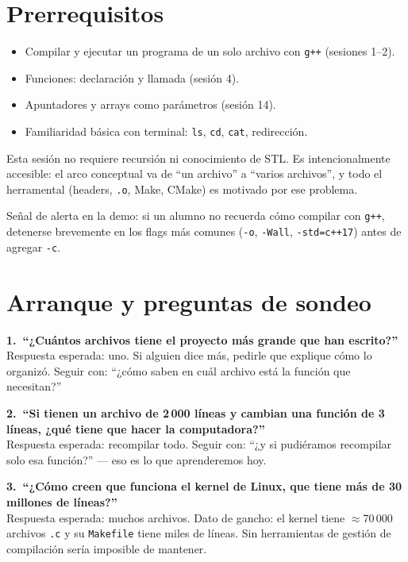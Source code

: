 \documentclass[12pt, oneside]{article}
\begin{document}
\section{Prerrequisitos}

\begin{itemize}
  \item Compilar y ejecutar un programa de un solo archivo con \texttt{g++}
        (sesiones 1--2).
  \item Funciones: declaración y llamada (sesión 4).
  \item Apuntadores y arrays como parámetros (sesión 14).
  \item Familiaridad básica con terminal: \texttt{ls}, \texttt{cd},
        \texttt{cat}, redirección.
\end{itemize}

\begin{notaprofesor}
  Esta sesión no requiere recursión ni conocimiento de STL.  Es intencionalmente
  accesible: el arco conceptual va de ``un archivo'' a ``varios archivos'', y todo
  el herramental (headers, \texttt{.o}, Make, CMake) es motivado por ese problema.
  \par\smallskip
  Señal de alerta en la demo: si un alumno no recuerda cómo compilar con
  \texttt{g++}, detenerse brevemente en los flags más comunes (\texttt{-o},
  \texttt{-Wall}, \texttt{-std=c++17}) antes de agregar \texttt{-c}.
\end{notaprofesor}

\section{Arranque y preguntas de sondeo}

\begin{notaprofesor}
  \textbf{1.\ ``¿Cuántos archivos tiene el proyecto más grande que han escrito?''}\\
  Respuesta esperada: uno.  Si alguien dice más, pedirle que explique cómo
  lo organizó.  Seguir con: ``¿cómo saben en cuál archivo está la función
  que necesitan?''

  \medskip
  \textbf{2.\ ``Si tienen un archivo de 2\,000 líneas y cambian una función
  de 3 líneas, ¿qué tiene que hacer la computadora?''}\\
  Respuesta esperada: recompilar todo.  Seguir con: ``¿y si pudiéramos
  recompilar solo esa función?'' — eso es lo que aprenderemos hoy.

  \medskip
  \textbf{3.\ ``¿Cómo creen que funciona el kernel de Linux, que tiene más
  de 30 millones de líneas?''}\\
  Respuesta esperada: muchos archivos.  Dato de gancho: el kernel tiene
  $\approx$70\,000 archivos \texttt{.c} y su \texttt{Makefile} tiene miles
  de líneas.  Sin herramientas de gestión de compilación sería imposible
  de mantener.
\end{notaprofesor}
\end{document}

